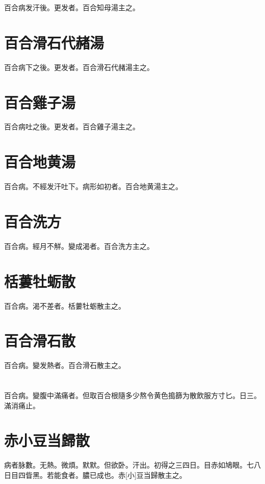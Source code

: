 \documentclass[12pt,twoside,UTF8,b5paper]{ctexbook}
\begin{document}
百合病发汗後。更发者。百合知母湯主之。

\section{百合滑石代赭湯}

百合病下之後。更发者。百合滑石代赭湯主之。

\section{百合雞子湯}

百合病吐之後。更发者。百合雞子湯主之。

\section{百合地黄湯}

百合病。不經发汗吐下。病形如初者。百合地黄湯主之。

\section{百合洗方}

百合病。經月不觧。變成渴者。百合洗方主之。

\section{栝蔞牡蛎散}

百合病。渴不差者。栝蔞牡蛎散主之。

\section{百合滑石散}

百合病。變发熱者。百合滑石散主之。

\section{}

百合病。變腹中滿痛者。但取百合根隨多少熬令黄色搗篩为散飲服方寸匕。日三。滿消痛止。

\section{赤小豆当歸散}

病者脉數。无熱。微煩。默默。但欲卧。汗出。初得之三四日。目赤如鳩眼。七八日目四眥黑。若能食者。膿已成也。赤[小]豆当歸散主之。
\end{document}
